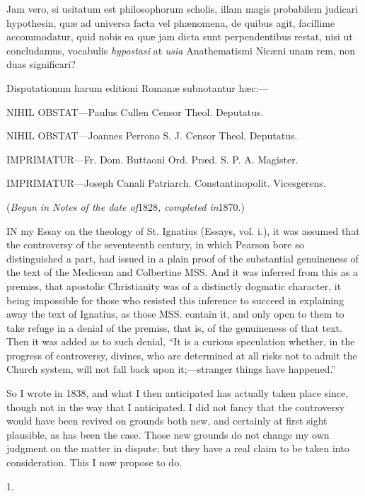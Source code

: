 Jam vero,
si usitatum est philosophorum scholis, illam magis probabilem
judicari hypothesin, quæ ad universa facta vel phænomena, de quibus
agit, facillime accommodatur, quid nobis ea quæ jam dicta sunt
perpendentibus restat, nisi ut concludamus, vocabulis \emph{hypostasi}
at \emph{usia} Anathematismi Nicæni unam rem, non duas significari?

Disputationum
harum editioni Romanæ subnotantur hæc:—

NIHIL
OBSTAT—Paulus
Cullen Censor Theol. Deputatus.

NIHIL OBSTAT—Joannes
Perrono S. J. Censor Theol. Deputatus.

IMPRIMATUR—Fr. Dom.
Buttaoni Ord. Præd. S. P. A. Magister.

IMPRIMATUR—Joseph Canali
Patriarch. Constantinopolit. Vicesgerens.


(\emph{Begun
in Notes of the date of}1828\emph{, completed in}1870.)

IN
my Essay on the theology of St. Ignatius (Essays, vol. i.), it was
assumed that the controversy of the seventeenth century, in which
Pearson bore so distinguished a part, had issued in a plain proof of
the substantial genuineness of the text of the Medicean and Colbertine
MSS. And it was inferred from this as a premiss, that apostolic
Christianity was of a distinctly dogmatic character, it being
impossible for those who resisted this inference to succeed in
explaining away the text of Ignatius, as those MSS. contain it, and
only open to them to take refuge in a denial of the premiss, that is,
of the genuineness of that text. Then it was added as to such denial, ``It
is a curious speculation whether, in the progress of controversy,
divines, who are determined at all risks not to admit the Church
system, will not fall back upon it;—stranger things have happened.''

So I wrote in 1838, and what I
then anticipated has actually taken place since, though not in the way
that I anticipated. I did not fancy that the controversy would have been revived on grounds both new, and certainly at first sight
plausible, as has been the case. Those new grounds do not change my
own judgment on the matter in dispute; but they have a real claim to
be taken into consideration. This I now propose to do.

1.

